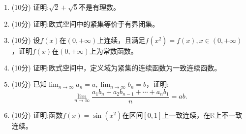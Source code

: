 \begin{enumerate}
    \item (10分) 证明:\(\sqrt{2}+\sqrt{5}\)不是有理数。

    \item (10分) 证明:欧式空间中的紧集等价于有界闭集。

    \item (10分) 设\(f(x)\)在\((0,+\infty)\)上连续，且满足\(f(x^2)=f(x), x \in(0,+\infty)\)，证明\(f(x)\)在\((0,+\infty)\)上为常数函数。

    \item (10分) 证明:欧式空间中，定义域为紧集的连续函数为一致连续函数。

    \item (10分) 已知\(\lim_{n \rightarrow \infty} a_n=a, \lim_{n \rightarrow \infty} b_n=b\)，证明:
    \begin{equation*}
        \lim_{n \rightarrow \infty} \frac{a_1 b_n+a_2 b_{n-1}+\cdots+a_n b_1}{n}=ab.
    \end{equation*}

    \item (10分) 证明:函数\(f(x)=\sin(x^2)\)在区间\([0,1]\)上一致连续，在\(\mathbb{R}\)上不一致连续。
\end{enumerate}